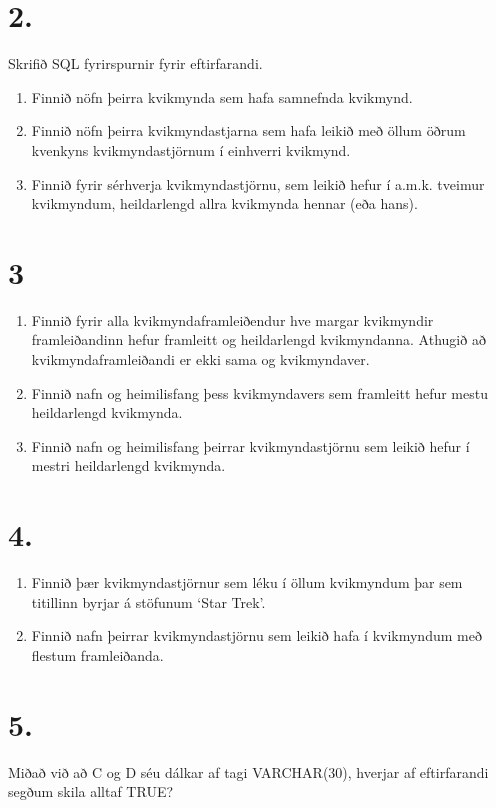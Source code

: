 \documentclass{article}
\newcommand{\enum}{\begin{enumerate}[label = \alph*.]}
\begin{document}
\newpage

\section{2.}
Skrifið SQL fyrirspurnir fyrir eftirfarandi.

\enum
\item Finnið nöfn þeirra kvikmynda sem hafa samnefnda kvikmynd.
\item Finnið nöfn þeirra kvikmyndastjarna sem hafa leikið með
öllum öðrum kvenkyns kvikmyndastjörnum í einhverri kvikmynd.
\item Finnið fyrir sérhverja kvikmyndastjörnu, sem leikið hefur í
a.m.k. tveimur kvikmyndum, heildarlengd allra kvikmynda hennar
(eða hans).
\end{enumerate}

\vspace{1cm}

\section{3}
\enum
\item Finnið fyrir alla kvikmyndaframleiðendur hve margar
kvikmyndir framleiðandinn hefur framleitt og heildarlengd 
kvikmyndanna. Athugið að kvikmyndaframleiðandi er ekki sama og
kvikmyndaver. 
\item Finnið nafn og heimilisfang þess kvikmyndavers sem framleitt
hefur mestu heildarlengd kvikmynda.
\item Finnið nafn og heimilisfang þeirrar kvikmyndastjörnu sem
leikið hefur í mestri heildarlengd kvikmynda.
\end{enumerate}

\vspace{1cm}

\section{4.}

\enum 
\item Finnið þær kvikmyndastjörnur sem léku í öllum kvikmyndum
þar sem titillinn byrjar á stöfunum ‘Star Trek’.
\item Finnið nafn þeirrar kvikmyndastjörnu sem leikið hafa í
kvikmyndum með flestum framleiðanda.
\end{enumerate}

\vspace{1cm}

\section{5.}
Miðað við að C og D séu dálkar af tagi VARCHAR(30), hverjar af
eftirfarandi segðum skila alltaf TRUE?
\end{document}

